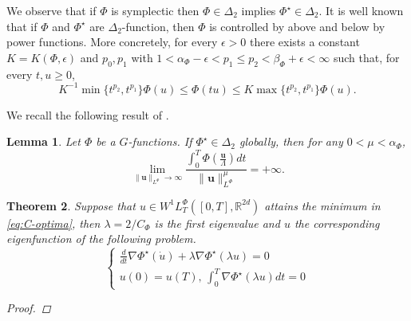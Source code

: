 \documentclass[twoside]{article}
\newtheorem{thm}{Theorem}[section]
\newtheorem{lem}[thm]{Lemma}
\theoremstyle{remark}
\newcommand{\orlnor}{\|_{L^{\Phi}}}
\newcommand{\lphi}{L^{\Phi}}
\newcommand{\wphit}{W^{1}\lphi_T}
\renewcommand{\b}[1]{\boldsymbol{#1}}
\newcommand{\rr}{\mathbb{R}}
\renewcommand{\leq}{\leqslant}
\renewcommand{\geq}{\geqslant}
\newcommand{\Phie}{\Phi^{\star}}
\begin{document}
We observe that if $\Phi$ is symplectic then $\Phi\in\Delta_2$ implies $\Phie\in\Delta_2$.  It is well known   that if $\Phi$  and $\Phie$ are $\Delta_2$-function, then $\Phi$ is controlled by above and below
 by power functions.  More concretely, for every $\epsilon>0$ there exists a
constant $K=K(\Phi,\epsilon)$ and $p_0,p_1$ with $1<\alpha_{\Phi}-\epsilon<p_1\leq p_2<\beta_{\Phi}+\epsilon<\infty$ such that, for every $t,u\geq 0$,
\begin{equation}\label{delta2-potencias}
    K^{-1}\min\big\{t^{p_2},t^{p_1} \big\}\Phi(u)\leq \Phi(t u)\leq
    K\max\big\{t^{p_2},t^{p_1} \big\}\Phi(u).
\end{equation}





We recall the following result of \cite{ABGMS2015}.

\begin{lem}\label{lem_coer} Let $\Phi$ be a  $G$-functions. If $\Phie \in \Delta_2$ globally, then  for any $0<\mu<\alpha_{\Phi}$,
\begin{equation}\label{coer_modular} \lim\limits_{\|\b{u}\orlnor \to \infty} \frac{\int_0^T\Phi\left(\frac{\b{u}}{\Lambda}\right)dt}{\|\b{u}\orlnor^{\mu}}=+\infty.
\end{equation}

\end{lem}





\begin{thm}\label{thm:C-opt-hamil} Suppose that $u\in \wphit([0,T],\rr^{2d})$ attains the minimum in \eqref{eq:C-optima}, then $\lambda=2/C_{\Phi}$ is the first eigenvalue and $u$ the corresponding eigenfunction of the following problem.
\begin{equation}\label{eq:eigen_prob}
\left\{
\begin{array}{l}
 \frac{d}{dt}\nabla\Phie(\dot{u})+\lambda\nabla\Phie(\lambda u)=0\\
 u(0)=u(T), \, \int_0^T\nabla\Phie (\lambda u)dt=0
\end{array}
\right.\tag{Eig}
\end{equation}
\begin{proof} 
 
\end{proof}






 
\end{thm}
\end{document}
